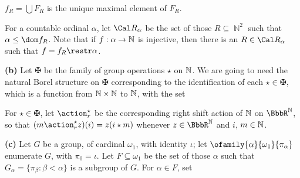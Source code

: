 
\noindent{}%
$f_R=\bigcup F_R$ is the unique maximal element of $F_R$.

For a countable ordinal $\alpha$, let
$\Cal R_{\alpha}$ be the set of those $R\subseteq\BbbN^2$ such that
$\alpha\le\dom f_R$.   Note that if $f:\alpha\to\Bbb N$ is injective, then
there is an $R\in\Cal R_{\alpha}$ such that
$f=f_R\restr\alpha$.

\medskip

{\bf (b)} Let $\maltese$ be the family of group operations $\star$ on 
$\Bbb N$.   We are going to need the natural Borel structure on
$\maltese$ corresponding to the identification of each $\star\in\maltese$,
which is a function from $\Bbb N\times\Bbb N$ to $\Bbb N$, with the set


\noindent{} For $\star\in\maltese$, let $\action^{\star}_r$ be the 
corresponding
right shift action of $\Bbb N$ on $\BbbR^{\Bbb N}$, so that
$(m\action^{\star}_rz)(i)=z(i\star m)$
whenever $z\in\BbbR^{\Bbb N}$ and $i$, $m\in\Bbb N$.

\medskip

{\bf (c)} Let $G$ be a group, of cardinal $\omega_1$, with
identity $\iota$;  let $\ofamily{\alpha}{\omega_1}{\pi_{\alpha}}$
enumerate $G$, with $\pi_0=\iota$.   Let $F\subseteq\omega_1$ be the
set of those $\alpha$ such that $G_{\alpha}=\{\pi_{\beta}:\beta<\alpha\}$
is a subgroup of $G$.
For $\alpha\in F$, set

